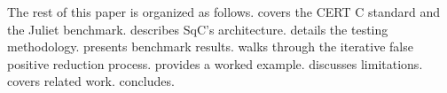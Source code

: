 The rest of this paper is organized as follows.  
covers the CERT C standard and the Juliet benchmark.
 describes SqC's architecture.
 details the testing methodology.
 presents benchmark results.
 walks through the iterative false positive
reduction process.   provides a worked
example.   discusses limitations.
 covers related work.  
concludes.
